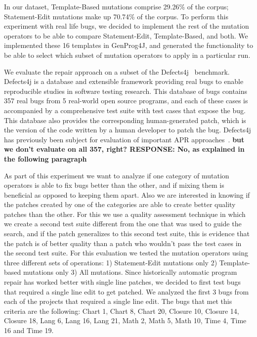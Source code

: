 \documentclass[conference]{IEEEtran}
\newcommand{\todo}[1]
  {{\scriptsize \textbf{\color{red} {#1}}}}
\begin{document}
In our dataset, Template-Based mutations comprise 29.26\% of the corpus; Statement-Edit mutations make up 70.74\% of the 
corpus. To perform this experiment with real life bugs, we decided to implement the rest 
of the mutation operators to be able to compare Statement-Edit, Template-Based, and both. We implemented these 16 templates in GenProg4J, and generated the functionality 
to be able to select which subset of mutation operators to apply in a particular 
run.

We evaluate the repair approach on a subset of the Defects4j~\cite{just14}
benchmark.  Defects4j is a database and extensible 
framework providing real bugs to enable reproducible studies in software testing 
research. This database of bugs contains 357 real bugs from 5 
real-world open source programs, and each of these cases is accompanied by a 
comprehensive test suite with test cases that expose the bug. This database also provides 
the corresponding human-generated patch, which is the version of the code written by a human 
developer to patch the bug. Defects4j has previously been 
subject for evaluation of important APR approaches~\cite{Durieux15}.\todo{but we
  don't evaluate on all 357, right? RESPONSE: No, as explained in the following paragraph}
  
  As part of this experiment we want to analyze if one category of mutation 
  operators is able to fix bugs better than the other, and if 
  mixing them is beneficial as opposed to keeping them apart. Also we are interested in 
knowing if the patches created by one of the categories are able to create better quality
patches than the other. For this we use a quality assessment technique in which we create a
second test suite different from the one that was used to guide the search, and if the patch
generalizes to this second test suite, this is evidence that the patch is of better quality than
a patch who wouldn't pass the test cases in the second test suite.  For this evaluation
we tested the mutation operators using three different sets 
of operations: 1) Statement-Edit mutations only 2) Template-based mutations 
only 3) All mutations.  
Since historically automatic program repair has worked better with single line 
patches, we decided to first test bugs that required a single line edit to get 
patched. We analyzed the first 3 bugs from each of the projects that required a 
single line edit. The bugs that met this criteria are the following: Chart 1, 
Chart 8, Chart 20, Closure 10, Closure 14, Closure 18, Lang 6, Lang 16, Lang 21, 
Math 2, Math 5, Math 10, Time 4, Time 16 and Time 19.
\end{document}
